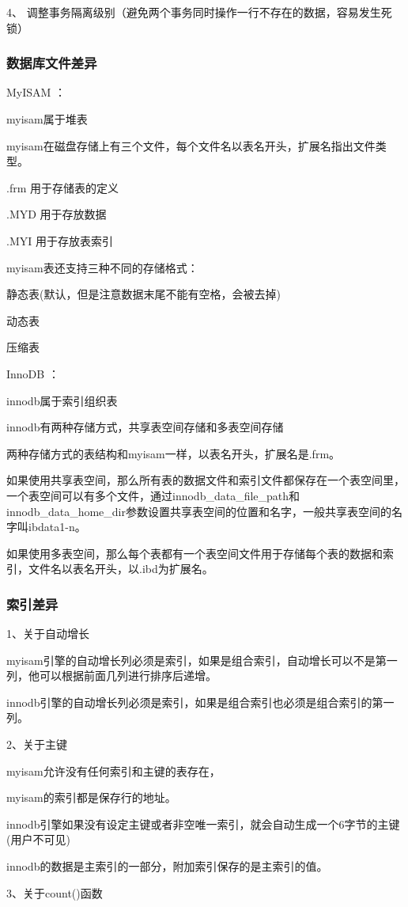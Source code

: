 \documentclass[UTF8]{ctexart}
\begin{document}
4、  调整事务隔离级别（避免两个事务同时操作一行不存在的数据，容易发生死锁）
\subsubsection{数据库文件差异}
MyISAM ：

myisam属于堆表

myisam在磁盘存储上有三个文件，每个文件名以表名开头，扩展名指出文件类型。

.frm 用于存储表的定义

.MYD 用于存放数据

.MYI 用于存放表索引

myisam表还支持三种不同的存储格式：

静态表(默认，但是注意数据末尾不能有空格，会被去掉)

动态表

压缩表

InnoDB ：

innodb属于索引组织表

innodb有两种存储方式，共享表空间存储和多表空间存储

两种存储方式的表结构和myisam一样，以表名开头，扩展名是.frm。

如果使用共享表空间，那么所有表的数据文件和索引文件都保存在一个表空间里，一个表空间可以有多个文件，通过innodb\_data\_file\_path和innodb\_data\_home\_dir参数设置共享表空间的位置和名字，一般共享表空间的名字叫ibdata1-n。

如果使用多表空间，那么每个表都有一个表空间文件用于存储每个表的数据和索引，文件名以表名开头，以.ibd为扩展名。

\subsubsection{索引差异}
1、关于自动增长

myisam引擎的自动增长列必须是索引，如果是组合索引，自动增长可以不是第一列，他可以根据前面几列进行排序后递增。

innodb引擎的自动增长列必须是索引，如果是组合索引也必须是组合索引的第一列。

2、关于主键

myisam允许没有任何索引和主键的表存在，

myisam的索引都是保存行的地址。

innodb引擎如果没有设定主键或者非空唯一索引，就会自动生成一个6字节的主键(用户不可见)

innodb的数据是主索引的一部分，附加索引保存的是主索引的值。

3、关于count()函数
\end{document}
